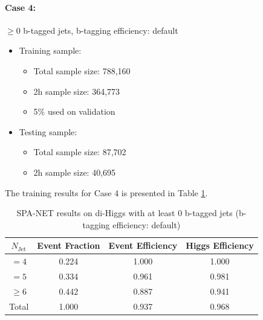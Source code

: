 \documentclass[12pt]{article}
\begin{document}
		\paragraph{Case 4:}$\ge 0$ b-tagged jets, b-tagging efficiency: default 
		\begin{itemize}
			\item Training sample:
			\begin{itemize}
				\item Total sample size: 788,160
				\item 2h sample size: 364,773
				\item 5\% used on validation
			\end{itemize}
			\item Testing sample: 
				\begin{itemize}
					\item Total sample size: 87,702
					\item 2h sample size: 40,695
				\end{itemize}
		\end{itemize}
		The training results for Case 4 is presented in Table \ref{tab:SPANet_0btag_default}.
		\begin{table}[htpb]
			\centering
			\caption{SPA-NET results on di-Higgs with at least 0 b-tagged jets (b-tagging efficiency: default)}
			\label{tab:SPANet_0btag_default}
			\begin{tabular}{c|c|cc}
				$N_\text{Jet}$ & Event Fraction & Event Efficiency & Higgs Efficiency \\
				\hline
				$=4$	  &   0.224             &     1.000             &  1.000        \\
				$=5$	  &   0.334             &     0.961             &  0.981        \\
				$\ge 6$	  &   0.442             &     0.887             &  0.941        \\
				Total	  &   1.000             &     0.937             &  0.968        \\
			\end{tabular}
		\end{table}
\end{document}
